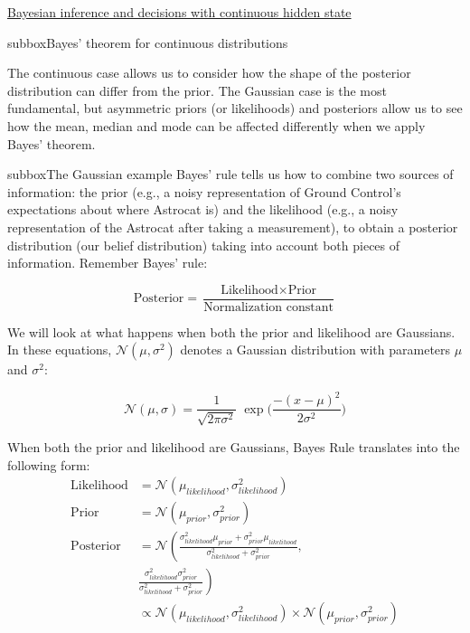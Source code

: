 \begin{textbox}{\href{https://compneuro.neuromatch.io/tutorials/W3D1_BayesianDecisions/student/W3D1_Tutorial2.html}{Bayesian inference and decisions with continuous hidden state } }
\begin{subbox}{subbox}{Bayes' theorem for continuous distributions}
\scriptsize

The continuous case allows us to consider how the shape of the posterior distribution can differ from the prior. The Gaussian case is the most fundamental, but asymmetric priors (or likelihoods) and posteriors allow us to see how the mean, median and mode can be affected differently when we apply Bayes' theorem.

\end{subbox}
\begin{subbox}{subbox}{The Gaussian example}
\scriptsize
Bayes' rule tells us how to combine two sources of information: the prior (e.g., a noisy representation of Ground Control's expectations about where Astrocat is) and the likelihood (e.g., a noisy representation of the Astrocat after taking a measurement), to obtain a posterior distribution (our belief distribution) taking into account both pieces of information. Remember Bayes' rule:

\begin{equation}
\text{Posterior} = \frac{ \text{Likelihood} \times \text{Prior}}{ \text{Normalization constant}}
\end{equation}

We will look at what happens when both the prior and likelihood are Gaussians. In these equations, $\mathcal{N}(\mu,\sigma^2)$ denotes a Gaussian distribution with parameters $\mu$ and $\sigma^2$:

\begin{equation}
\mathcal{N}(\mu, \sigma) = \frac{1}{\sqrt{2 \pi \sigma^2}} \; \exp \bigg( \frac{-(x-\mu)^2}{2\sigma^2} \bigg)
\end{equation}

When both the prior and likelihood are Gaussians, Bayes Rule translates into the following form:
\tiny
\begin{align*}
\text{Likelihood} &= \mathcal{N}(\mu_{likelihood},\sigma_{likelihood}^2) \\
\text{Prior} &= \mathcal{N}(\mu_{prior},\sigma_{prior}^2) \\
\text{Posterior} &= \mathcal{N}\left( \frac{\sigma^2_{likelihood}\mu_{prior}+\sigma^2_{prior}\mu_{likelihood}}{\sigma^2_{likelihood}+\sigma^2_{prior}},\right.\\
& \left. \frac{\sigma^2_{likelihood}\sigma^2_{prior}}{\sigma^2_{likelihood}+\sigma^2_{prior}} \right) \\
&\propto \mathcal{N}(\mu_{likelihood},\sigma_{likelihood}^2) \times \mathcal{N}(\mu_{prior},\sigma_{prior}^2)
\end{align*}



\end{subbox}
\end{textbox}
